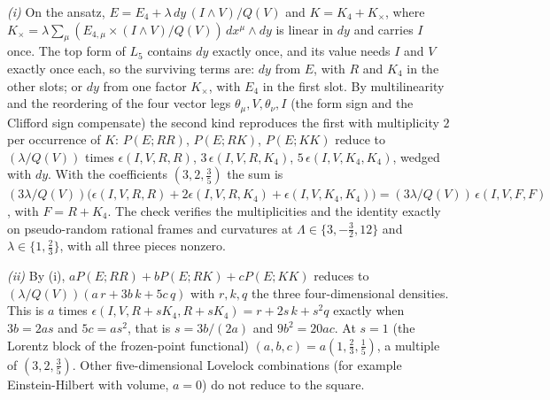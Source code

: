 \emph{(i)} On the ansatz, $E = E_{4} + \lambda\,dy\,(I\wedge V)/Q(V)$ and $K = K_{4} + K_{\times}$, where $K_{\times} = \lambda\sum_{\mu}(E_{4,\mu}\times(I\wedge V)/Q(V))\,dx^{\mu}\wedge dy$ is linear in $dy$ and carries $I$ once. The top form of $L_{5}$ contains $dy$ exactly once, and its value needs $I$ and $V$ exactly once each, so the surviving terms are: $dy$ from $E$, with $R$ and $K_{4}$ in the other slots; or $dy$ from one factor $K_{\times}$, with $E_{4}$ in the first slot. By multilinearity and the reordering of the four vector legs $\theta_{\mu}, V, \theta_{\nu}, I$ (the form sign and the Clifford sign compensate) the second kind reproduces the first with multiplicity $2$ per occurrence of $K$: $P(E; RR)$, $P(E; RK)$, $P(E; KK)$ reduce to $(\lambda/Q(V))$ times $\epsilon(I, V, R, R)$, $3\,\epsilon(I, V, R, K_{4})$, $5\,\epsilon(I, V, K_{4}, K_{4})$, wedged with $dy$. With the coefficients $(3, 2, \tfrac35)$ the sum is $(3\lambda/Q(V))\big(\epsilon(I, V, R, R) + 2\epsilon(I, V, R, K_{4}) + \epsilon(I, V, K_{4}, K_{4})\big) = (3\lambda/Q(V))\,\epsilon(I, V, F, F)$, with $F = R + K_{4}$. The check verifies the multiplicities and the identity exactly on pseudo-random rational frames and curvatures at $\Lambda \in \{3, -\tfrac32, 12\}$ and $\lambda \in \{1, \tfrac23\}$, with all three pieces nonzero.

\emph{(ii)} By (i), $aP(E; RR) + bP(E; RK) + cP(E; KK)$ reduces to $(\lambda/Q(V))(a\,r + 3b\,k + 5c\,q)$ with $r, k, q$ the three four-dimensional densities. This is $a$ times $\epsilon(I, V, R + sK_{4}, R + sK_{4}) = r + 2s\,k + s^{2}q$ exactly when $3b = 2as$ and $5c = as^{2}$, that is $s = 3b/(2a)$ and $9b^{2} = 20ac$. At $s = 1$ (the Lorentz block of the frozen-point functional) $(a, b, c) = a(1, \tfrac23, \tfrac15)$, a multiple of $(3, 2, \tfrac35)$. Other five-dimensional Lovelock combinations (for example Einstein-Hilbert with volume, $a = 0$) do not reduce to the square.

